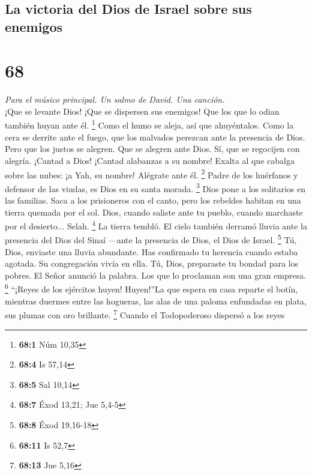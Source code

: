 \begin{paracol}{2}
\hypertarget{la-victoria-del-dios-de-israel-sobre-sus-enemigos}{%
\subsection{La victoria del Dios de Israel sobre sus
enemigos}\label{la-victoria-del-dios-de-israel-sobre-sus-enemigos}}

\hypertarget{section-134}{%
\section{68}\label{section-134}}

\emph{Para el músico principal. Un salmo de David. Una canción.}\\
 ¡Que se levante Dios! ¡Que se dispersen sus enemigos! Que
los que lo odian también huyan ante él. \footnote{\textbf{68:1} Núm
  10,35}  Como el humo se aleja, así que ahuyéntalos. Como
la cera se derrite ante el fuego, que los malvados perezcan ante la
presencia de Dios.  Pero que los justos se alegren. Que se
alegren ante Dios. Sí, que se regocijen con alegría. 
¡Cantad a Dios! ¡Cantad alabanzas a su nombre! Exalta al que cabalga
sobre las nubes: ¡a Yah, su nombre! Alégrate ante él. \footnote{\textbf{68:4}
  Is 57,14}  Padre de los huérfanos y defensor de las
viudas, es Dios en su santa morada. \footnote{\textbf{68:5} Sal 10,14}
 Dios pone a los solitarios en las familias. Saca a los
prisioneros con el canto, pero los rebeldes habitan en una tierra
quemada por el sol.  Dios, cuando saliste ante tu pueblo,
cuando marchaste por el desierto... Selah. \footnote{\textbf{68:7} Éxod
  13,21; Jue 5,4-5}  La tierra tembló. El cielo también
derramó lluvia ante la presencia del Dios del Sinaí ---ante la presencia
de Dios, el Dios de Israel. \footnote{\textbf{68:8} Éxod 19,16-18}
 Tú, Dios, enviaste una lluvia abundante. Has confirmado
tu herencia cuando estaba agotada.  Su congregación vivía
en ella. Tú, Dios, preparaste tu bondad para los pobres. 
El Señor anunció la palabra. Los que lo proclaman son una gran empresa.
\footnote{\textbf{68:11} Is 52,7}  ``¡Reyes de los
ejércitos huyen! Huyen!''La que espera en casa reparte el botín,
 mientras duermes entre las hogueras, las alas de una
paloma enfundadas en plata, sus plumas con oro brillante. \footnote{\textbf{68:13}
  Jue 5,16}  Cuando el Todopoderoso dispersó a los reyes

\end{paracol}
